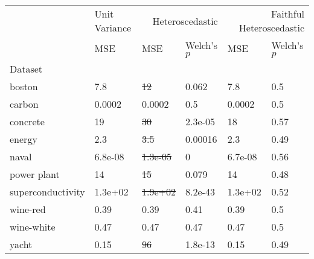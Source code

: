 \begin{tabular}{l|l|ll|ll}
\toprule
 & Unit Variance & \multicolumn{2}{r}{Heteroscedastic} & \multicolumn{2}{r}{Faithful Heteroscedastic} \\
 & MSE & MSE & Welch's $p$ & MSE & Welch's $p$ \\
Dataset &  &  &  &  &  \\
\midrule
boston & 7.8 & \sout{12} & 0.062 & 7.8 & 0.5 \\
carbon & 0.0002 & 0.0002 & 0.5 & 0.0002 & 0.5 \\
concrete & 19 & \sout{30} & 2.3e-05 & 18 & 0.57 \\
energy & 2.3 & \sout{3.5} & 0.00016 & 2.3 & 0.49 \\
naval & 6.8e-08 & \sout{1.3e-05} & 0 & 6.7e-08 & 0.56 \\
power plant & 14 & \sout{15} & 0.079 & 14 & 0.48 \\
superconductivity & 1.3e+02 & \sout{1.9e+02} & 8.2e-43 & 1.3e+02 & 0.52 \\
wine-red & 0.39 & 0.39 & 0.41 & 0.39 & 0.5 \\
wine-white & 0.47 & 0.47 & 0.47 & 0.47 & 0.5 \\
yacht & 0.15 & \sout{96} & 1.8e-13 & 0.15 & 0.49 \\
\bottomrule
\end{tabular}
